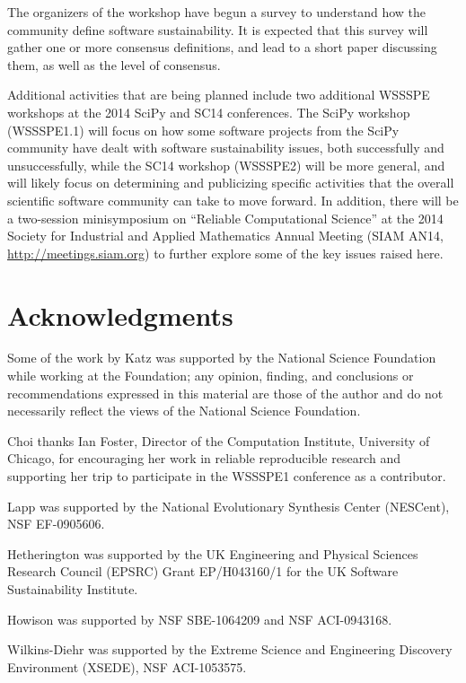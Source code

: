 \documentclass[11pt, oneside]{amsart}
\newcommand{\todo}[1]{{\color{blue}$\blacksquare$~\textsf{[TODO: #1]}}}
\begin{document}
The organizers of the workshop have begun a survey to understand how
the community define software sustainability.  It is expected that
this survey will gather one or more consensus definitions, and lead to
a short paper discussing them, as well as the level of consensus.

Additional activities that are being planned include two additional
WSSSPE workshops at the 2014 SciPy and SC14 conferences.  The SciPy
workshop (WSSSPE1.1) will focus on how some software projects from the
SciPy community have dealt with software sustainability issues, both
successfully and unsuccessfully, while the SC14 workshop (WSSSPE2)
will be more general, and will likely focus on determining and
publicizing specific activities that the overall scientific software
community can take to move forward.  In addition, there will be a
two-session minisymposium on ``Reliable Computational Science'' at the 2014
Society for Industrial and Applied Mathematics Annual Meeting (SIAM
AN14, \url{http://meetings.siam.org}) to further explore some of the
key issues raised here.




\section*{Acknowledgments}


Some of the work by Katz was supported by the National Science
Foundation while working at the Foundation; any opinion, finding, and
conclusions or recommendations expressed in this material are those of
the author and do not necessarily reflect the views of the National
Science Foundation.

Choi thanks Ian Foster, Director of the Computation Institute,
University of Chicago, for encouraging her work in reliable
reproducible research and supporting her trip to participate in the
WSSSPE1 conference as a contributor.

Lapp was supported by the National Evolutionary Synthesis Center
(NESCent), NSF EF-0905606.

Hetherington was supported by the UK Engineering and Physical Sciences
Research Council (EPSRC) Grant EP/H043160/1 for the UK Software
Sustainability Institute.

Howison was supported by NSF SBE-1064209 and NSF ACI-0943168.

Wilkins-Diehr was supported by the Extreme Science and Engineering Discovery Environment (XSEDE), 
NSF ACI-1053575.
\end{document}
